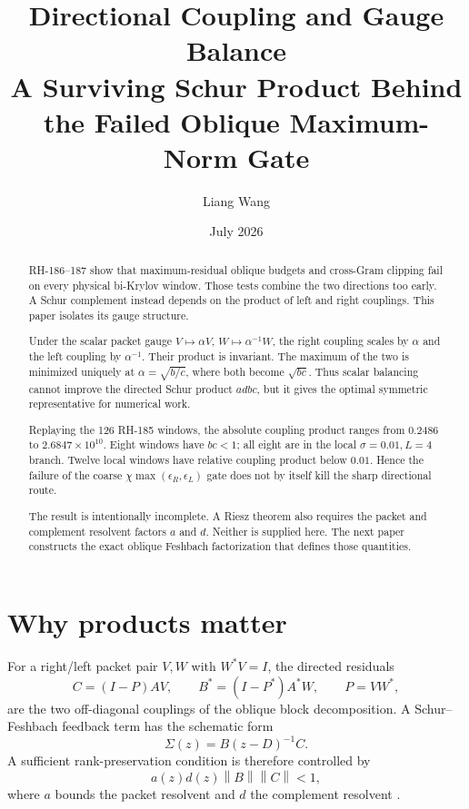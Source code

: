 \documentclass[12pt]{article}
\title{Directional Coupling and Gauge Balance\\
\large A Surviving Schur Product Behind the Failed Oblique Maximum-Norm Gate}
\author{Liang Wang}
\date{July 2026}
\theoremstyle{remark}
\newcommand{\norm}[1]{\left\lVert#1\right\rVert}
\begin{document}
\maketitle

\begin{abstract}
RH-186--187 show that maximum-residual oblique budgets and cross-Gram
clipping fail on every physical bi-Krylov window.  Those tests combine the two
directions too early.  A Schur complement instead depends on the product of
left and right couplings.  This paper isolates its gauge structure.

Under the scalar packet gauge $V\mapsto\alpha V$,
$W\mapsto\alpha^{-1}W$, the right coupling scales by $\alpha$ and the left
coupling by $\alpha^{-1}$.  Their product is invariant.  The maximum of the
two is minimized uniquely at
$\alpha=\sqrt{b/c}$, where both become $\sqrt{bc}$.  Thus scalar balancing
cannot improve the directed Schur product $adbc$, but it gives the optimal
symmetric representative for numerical work.

Replaying the 126 RH-185 windows, the absolute coupling product ranges from
$0.2486$ to $2.6847\times10^{10}$.  Eight windows have $bc<1$; all eight are
in the local $\sigma=0.01,L=4$ branch.  Twelve local windows have relative
coupling product below $0.01$.  Hence the failure of the coarse
$\chi\max(\epsilon_R,\epsilon_L)$ gate does not by itself kill the sharp
directional route.

The result is intentionally incomplete.  A Riesz theorem also requires the
packet and complement resolvent factors $a$ and $d$.  Neither is supplied
here.  The next paper constructs the exact oblique Feshbach factorization
that defines those quantities.
\end{abstract}

\section{Why products matter}

For a right/left packet pair $V,W$ with $W^*V=I$, the directed residuals
\begin{equation}\label{eq:residuals}
 C=(I-P)AV,
 \qquad
 B^*=(I-P^*)A^*W,
 \qquad P=VW^*,
\end{equation}
are the two off-diagonal couplings of the oblique block decomposition.  A
Schur--Feshbach feedback term has the schematic form
\begin{equation}\label{eq:feedback}
 \Sigma(z)=B(z-D)^{-1}C.
\end{equation}
A sufficient rank-preservation condition is therefore controlled by
\begin{equation}\label{eq:schur-product}
 a(z)d(z)\norm B\norm C<1,
\end{equation}
where $a$ bounds the packet resolvent and $d$ the complement resolvent
\citep{GohbergGoldbergKaashoek1990,WangRH171}.
\end{document}
